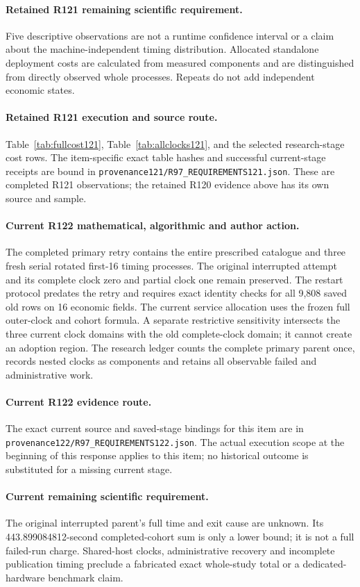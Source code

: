 \paragraph{Retained R121 remaining scientific requirement.}
Five descriptive observations are not a runtime confidence interval or a claim about the machine-independent timing distribution. Allocated standalone deployment costs are calculated from measured components and are distinguished from directly observed whole processes. Repeats do not add independent economic states.

\paragraph{Retained R121 execution and source route.}
Table~\ref{tab:fullcost121}, Table~\ref{tab:allclocks121}, and the selected research-stage cost rows.
The item-specific exact table hashes and successful current-stage receipts are bound in \nolinkurl{provenance121/R97_REQUIREMENTS121.json}. These are completed R121 observations; the retained R120 evidence above has its own source and sample.
\paragraph{Current R122 mathematical, algorithmic and author action.}
The completed primary retry contains the entire prescribed catalogue and three fresh serial rotated first-16 timing processes. The original interrupted attempt and its complete clock zero and partial clock one remain preserved. The restart protocol predates the retry and requires exact identity checks for all 9,808 saved old rows on 16 economic fields. The current service allocation uses the frozen full outer-clock and cohort formula. A separate restrictive sensitivity intersects the three current clock domains with the old complete-clock domain; it cannot create an adoption region. The research ledger counts the complete primary parent once, records nested clocks as components and retains all observable failed and administrative work.
\paragraph{Current R122 evidence route.}
The exact current source and saved-stage bindings for this item are in \nolinkurl{provenance122/R97_REQUIREMENTS122.json}. The actual execution scope at the beginning of this response applies to this item; no historical outcome is substituted for a missing current stage.
\paragraph{Current remaining scientific requirement.}
The original interrupted parent's full time and exit cause are unknown. Its 443.899084812-second completed-cohort sum is only a lower bound; it is not a full failed-run charge. Shared-host clocks, administrative recovery and incomplete publication timing preclude a fabricated exact whole-study total or a dedicated-hardware benchmark claim.

